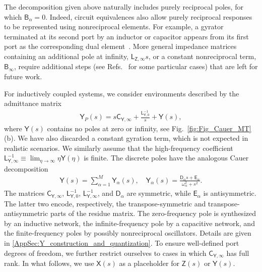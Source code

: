 \documentclass[prx,aps,twocolumn,article]{revtex4-2}
\newcommand{\msf}[1]{\mathsf{#1}}
\newcommand{\msY}{\msf{Y}}
\newcommand{\msZ}{\msf{Z}}
\newcommand{\msL}{\msf{L}}
\newcommand{\msC}{\msf{C}}
\newcommand{\msB}{\msf{B}}
\newcommand{\msD}{\msf{D}}
\newcommand{\msE}{\msf{E}}
\newcommand{\msX}{\msf{X}}
\begin{document}
The decomposition given above naturally includes purely reciprocal poles, for which $\msB_\alpha=0$. Indeed, circuit equivalences also allow purely reciprocal responses to be represented using nonreciprocal elements. For example, a gyrator terminated at its second port by an inductor or capacitor appears from its first port as the corresponding dual element~\cite{Newcomb:1966,Carlin:1964}. More general impedance matrices containing an additional pole at infinity, $\msL_{\msZ,\infty}s$, or a constant nonreciprocal term, $\msB_\infty$, require additional steps (see Refs.~\cite{ParraRodriguez:2018,ParraRodriguezPhD:2021,Labarca:2024,ParraRodriguez:2025,Yang:2026} for some particular cases) that are left for future work.

For inductively coupled systems, we consider environments described by the admittance matrix 
\begin{align}
    \msY_P(s)
    =s\msC_{\msY,\infty}+
    \frac{\msL_{\msY,0}^{-1}}{s}
    +\msY(s),
    \label{eq:Y_P_class}
\end{align}
where $\msY(s)$ contains no poles at zero or infinity, see Fig.~\ref{fig:Fig_Cauer_MT}(b). We have also discarded a constant gyration term, which is not expected in realistic scenarios. We similarly assume that the high-frequency coefficient $\msL_{\msY,\infty}^{-1}\equiv\lim_{\eta\rightarrow\infty}\eta\msY(\eta)$ is finite. The discrete poles have the analogous Cauer decomposition
\begin{align}
    \msY(s)=\sum_{\alpha=1}^{M}{\msY}_{\alpha}(s),\quad\msY_{\alpha}(s)=\frac{\msD_{\alpha} s + \msE_{\alpha}}{\omega_{\alpha}^2 + s^2}.
\end{align}
The matrices $\msC_{\msY,\infty}$, $\msL_{\msY,0}^{-1}$, $\msL_{\msY,\infty}^{-1}$, and $\msD_{\alpha}$ are symmetric, while $\msE_{\alpha}$ is antisymmetric. The latter two encode, respectively, the transpose-symmetric and transpose-antisymmetric parts of the residue matrix.
The zero-frequency pole is synthesized by an inductive network, the infinite-frequency pole by a capacitive network, and the finite-frequency poles by possibly nonreciprocal oscillators. Details are given in \cref{AppSec:Y_construction_and_quantization}. To ensure well-defined port
degrees of freedom, we further restrict ourselves to cases in which $\msC_{\msY,\infty}$ has full rank. In what follows, we use $\msX(s)$ as a placeholder for $\msZ(s)$ or $\msY(s)$.
\end{document}
